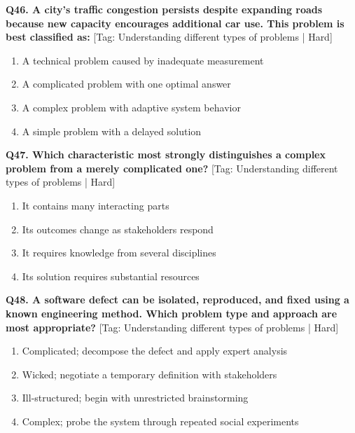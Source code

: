 \noindent\textbf{Q46. A city's traffic congestion persists despite expanding roads because new capacity encourages additional car use. This problem is best classified as:} \hfill [Tag: Understanding different types of problems | Hard]
\begin{enumerate}[label=(\alph*),topsep=2pt,itemsep=1pt,partopsep=0pt,parsep=0pt]
    \item {A technical problem caused by inadequate measurement}
    \item {A complicated problem with one optimal answer}
    \item {A complex problem with adaptive system behavior}
    \item {A simple problem with a delayed solution}
\end{enumerate}
\vspace{2mm}

\noindent\textbf{Q47. Which characteristic most strongly distinguishes a complex problem from a merely complicated one?} \hfill [Tag: Understanding different types of problems | Hard]
\begin{enumerate}[label=(\alph*),topsep=2pt,itemsep=1pt,partopsep=0pt,parsep=0pt]
    \item {It contains many interacting parts}
    \item {Its outcomes change as stakeholders respond}
    \item {It requires knowledge from several disciplines}
    \item {Its solution requires substantial resources}
\end{enumerate}
\vspace{2mm}

\noindent\textbf{Q48. A software defect can be isolated, reproduced, and fixed using a known engineering method. Which problem type and approach are most appropriate?} \hfill [Tag: Understanding different types of problems | Hard]
\begin{enumerate}[label=(\alph*),topsep=2pt,itemsep=1pt,partopsep=0pt,parsep=0pt]
    \item {Complicated; decompose the defect and apply expert analysis}
    \item {Wicked; negotiate a temporary definition with stakeholders}
    \item {Ill-structured; begin with unrestricted brainstorming}
    \item {Complex; probe the system through repeated social experiments}
\end{enumerate}
\vspace{2mm}

